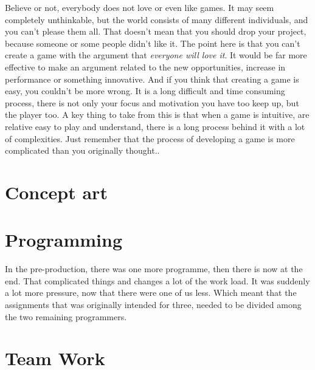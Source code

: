 Believe or not, everybody does not love or even like games. It may seem completely unthinkable, but the world consists of many different individuals, and you can't please them all. That doesn't mean that you should drop your project, because someone or some people didn't like it. The point here is that you can't create a game with the argument that \textit{everyone will love it}. It would be far more effective to make an argument related to the new opportunities, increase in performance  or something innovative. And if you think that creating a game is easy, you couldn't be more wrong. It is a long difficult and time consuming process, there is not only your focus and motivation you have too keep up, but the player too. A key thing to take from this is that  when a game is intuitive, are relative easy to play and understand, there is a long process behind it with a lot of complexities. Just remember that the process of developing a game is more complicated than you originally thought.\cite[P~18-20]{GamificationFieldbook}.

\section{Concept art}

\section{Programming}
\label{sec:PreProgrammin}
In the pre-production, there was one more programme, then there is now at the end. That complicated things and changes a lot of the work load. It was suddenly a lot more pressure, now that there were one of us less. Which meant that the assignments that was originally intended for three, needed to be divided among the two remaining programmers. 

\section{Team Work}
